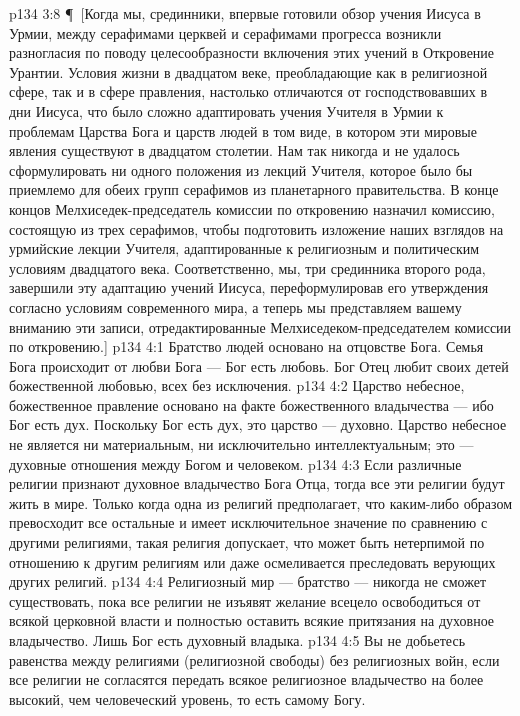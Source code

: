 \vs p134 3:8 \P\ [Когда мы, срединники, впервые готовили обзор учения Иисуса в Урмии, между серафимами церквей и серафимами прогресса возникли разногласия по поводу целесообразности включения этих учений в Откровение Урантии. Условия жизни в двадцатом веке, преобладающие как в религиозной сфере, так и в сфере правления, настолько отличаются от господствовавших в дни Иисуса, что было сложно адаптировать учения Учителя в Урмии к проблемам Царства Бога и царств людей в том виде, в котором эти мировые явления существуют в двадцатом столетии. Нам так никогда и не удалось сформулировать ни одного положения из лекций Учителя, которое было бы приемлемо для обеих групп серафимов из планетарного правительства. В конце концов Мелхиседек\hyp{}председатель комиссии по откровению назначил комиссию, состоящую из трех серафимов, чтобы подготовить изложение наших взглядов на урмийские лекции Учителя, адаптированные к религиозным и политическим условиям двадцатого века. Соответственно, мы, три срединника второго рода, завершили эту адаптацию учений Иисуса, переформулировав его утверждения согласно условиям современного мира, а теперь мы представляем вашему вниманию эти записи, отредактированные Мелхиседеком\hyp{}председателем комиссии по откровению.]
\vs p134 4:1 Братство людей основано на отцовстве Бога. Семья Бога происходит от любви Бога --- Бог есть любовь. Бог Отец любит своих детей божественной любовью, всех без исключения.
\vs p134 4:2 Царство небесное, божественное правление основано на факте божественного владычества --- ибо Бог есть дух. Поскольку Бог есть дух, это царство --- духовно. Царство небесное не является ни материальным, ни исключительно интеллектуальным; это --- духовные отношения между Богом и человеком.
\vs p134 4:3 Если различные религии признают духовное владычество Бога Отца, тогда все эти религии будут жить в мире. Только когда одна из религий предполагает, что каким\hyp{}либо образом превосходит все остальные и имеет исключительное значение по сравнению с другими религиями, такая религия допускает, что может быть нетерпимой по отношению к другим религиям или даже осмеливается преследовать верующих других религий.
\vs p134 4:4 Религиозный мир --- братство --- никогда не сможет существовать, пока все религии не изъявят желание всецело освободиться от всякой церковной власти и полностью оставить всякие притязания на духовное владычество. Лишь Бог есть духовный владыка.
\vs p134 4:5 Вы не добьетесь равенства между религиями (религиозной свободы) без религиозных войн, если все религии не согласятся передать всякое религиозное владычество на более высокий, чем человеческий уровень, то есть самому Богу.
